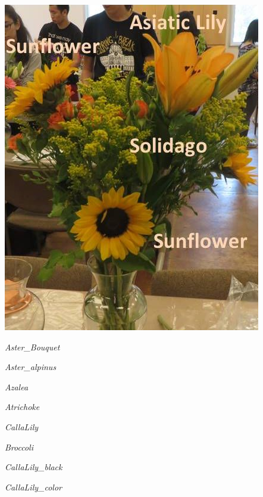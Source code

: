 \documentclass{article}
\begin{document}
\begin{center}
\includegraphics[height=0.9\textheight, angle=90]{../Arrangement4.jpg}
\end{center}
\newpage

\noindent
\vfill
\centerline{{\Large\emph{Aster_Bouquet}}}
\vfill
\newpage

\noindent
\vfill
\centerline{{\Large\emph{Aster_alpinus}}}
\vfill
\newpage

\noindent
\vfill
\centerline{{\Large\emph{Azalea}}}
\vfill
\newpage

\noindent
\vfill
\centerline{{\Large\emph{Atrichoke}}}
\vfill
\newpage

\noindent
\vfill
\centerline{{\Large\emph{CallaLily}}}
\vfill
\newpage

\noindent
\vfill
\centerline{{\Large\emph{Broccoli}}}
\vfill
\newpage

\noindent
\vfill
\centerline{{\Large\emph{CallaLily_black}}}
\vfill
\newpage

\noindent
\vfill
\centerline{{\Large\emph{CallaLily_color}}}
\vfill
\newpage
\end{document}
